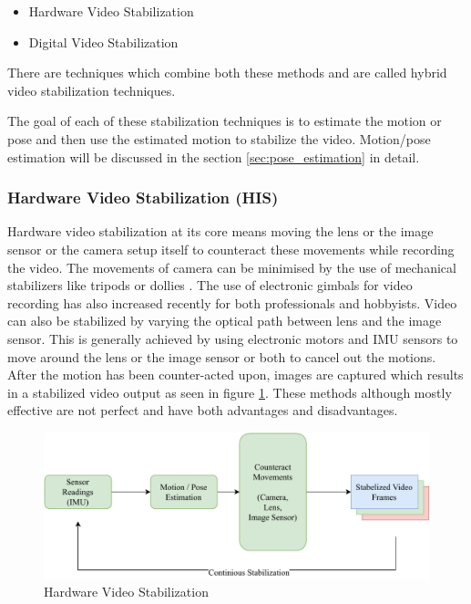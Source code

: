 \begin{itemize}
\item Hardware Video Stabilization
\item Digital Video Stabilization  
\end{itemize}
There are techniques which combine both these methods and are called hybrid video stabilization techniques.

The goal of each of these stabilization techniques is to estimate the motion or pose and then use the estimated motion to stabilize the video. Motion/pose estimation will be discussed in the section \ref{sec:pose_estimation} in detail.


\subsubsection{Hardware Video Stabilization (HIS)}
Hardware video stabilization at its core means moving the lens or the image sensor or the camera setup itself to counteract these movements while recording the video. The movements of camera can be minimised by the use of mechanical stabilizers like tripods or dollies \citep{5995525}. The use of electronic gimbals for video recording has also increased recently for both professionals and hobbyists. Video can also be stabilized by varying the optical path between lens and the image sensor. This is generally achieved by using electronic motors and IMU sensors to move around the lens or the image sensor or both to cancel out the motions. After the motion has been counter-acted upon, images are captured which results in a stabilized video output as seen in figure \ref{fig:his}. These methods although mostly effective are not perfect and have both advantages and disadvantages.


\begin{figure}[H]
\centering
\includegraphics[scale=0.6]{images/fig_chapter2/2_1_his.pdf}
\caption{Hardware Video Stabilization}
\label{fig:his}
\end{figure}

